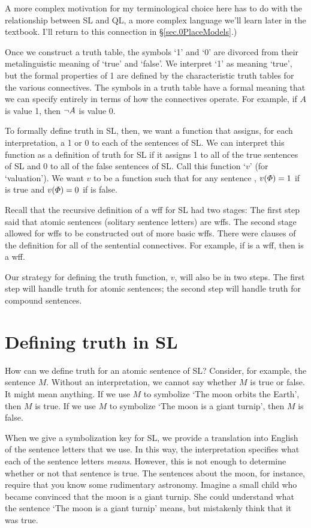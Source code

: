 A more complex motivation for my terminological choice here has to do with the relationship between SL and QL, a more complex language we'll learn later in the textbook. I'll return to this connection in \S\ref{sec.0PlaceModels}.)

Once we construct a truth table, the symbols `1' and `0' are divorced from their metalinguistic meaning of `true' and `false'. We interpret `1' as meaning `true', but the formal properties of 1 are defined by the characteristic truth tables for the various connectives.  The symbols in a truth table have a formal meaning that we can specify entirely in terms of how the connectives operate. For example, if $A$ is value 1, then $\neg A$ is value 0.

To formally define truth in SL, then, we want a function that assigns, for each interpretation, a 1 or 0 to each of the sentences of SL. We can interpret this function as a definition of truth for SL if it assigns 1 to all of the true sentences of SL and 0 to all of the false sentences of SL. Call this function `$v$' (for `valuation'). We want $v$ to be a function such that for any sentence \metaA{}, $v(\varPhi{})=1$ if \metaA{} is true and $v(\varPhi{})=0$ if \metaA{} is false.

Recall that the recursive definition of a wff for SL had two stages: The first step said that atomic sentences (solitary sentence letters) are wffs. The second stage allowed for wffs to be constructed out of more basic wffs. There were clauses of the definition for all of the sentential connectives. For example, if \metaA{} is a wff, then \enot\metaA{} is a wff.

Our strategy for defining the truth function, $v$, will also be in two steps. The first step will handle truth for atomic sentences; the second step will handle truth for compound sentences.


\section{Defining truth in SL}
How can we define truth for an atomic sentence of SL? Consider, for example, the sentence $M$. Without an interpretation, we cannot say whether $M$ is true or false. It might mean anything. If we use $M$ to symbolize `The moon orbits the Earth', then $M$ is true. If we use $M$ to symbolize `The moon is a giant turnip', then $M$ is false.

When we give a symbolization key for SL, we provide a translation into English of the sentence letters that we use. In this way, the interpretation specifies what each of the sentence letters \emph{means}. However, this is not enough to determine whether or not that sentence is true. The sentences about the moon, for instance, require that you know some rudimentary astronomy. Imagine a small child who became convinced that the moon is a giant turnip. She could understand what the sentence `The moon is a giant turnip' means, but mistakenly think that it was true.


